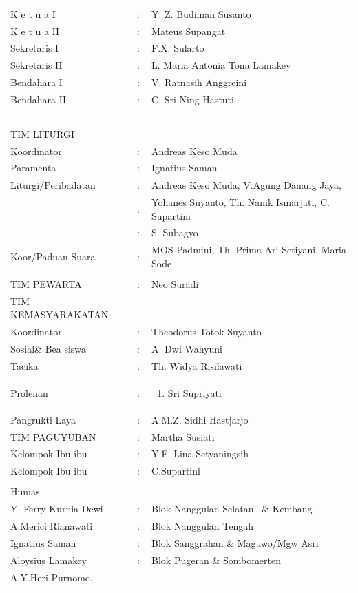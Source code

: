 \documentclass{article}
\begin{document}
\begin{flushleft}
\tablehead{}
\begin{supertabular}{m{4.1200004cm}m{0.15299998cm}m{8.621cm}}
K e t u a I &
\centering : &
Y. Z. Budiman Susanto\\
K e t u a II &
\centering : &
Mateus Supangat\\
Sekretaris I &
\centering : &
F.X. Sularto\\
Sekretaris II &
\centering : &
L. Maria Antonia Tona Lamakey\\
Bendahara I &
\centering : &
V. Ratnasih Anggreini\\
Bendahara II &
\centering : &
C. Sri Ning Hastuti\\
~ &
\centering ~ &
~\\
TIM LITURGI &
\centering ~ &
~\\
Koordinator &
\centering : &
Andreas Keso Muda\\
Paramenta  &
\centering : &
Ignatius Saman\\
Liturgi/Peribadatan &
\centering : &
Andreas Keso Muda, V.Agung Danang Jaya,\\
~ &
\centering : &
Yohanes Suyanto, Th. Nanik Ismarjati, C. Supartini\\
~ &
\centering : &
S. Subagyo\\
Koor/Paduan Suara &
\centering :   &
MOS Padmini, Th. Prima Ari Setiyani, Maria Sode\\
 &
 &
\\
TIM PEWARTA   &
\centering : &
Neo Suradi

\\
TIM KEMASYARAKATAN &
\centering ~ &
\\
Koordinator &
\centering : &
Theodorus Totok Suyanto\\
Sosial\& Bea siswa &
\centering : &
A. Dwi Wahyuni \\
Tacika &
\centering : &
Th. Widya Risilawati\\
Prolenan &
\centering : &
\begin{enumerate}
\item Sri Supriyati\end{enumerate}
\\
Pangrukti Laya &
\centering : &
A.M.Z. Sidhi Hastjarjo\\
TIM PAGUYUBAN &
\centering : &
Martha Susiati\\
Kelompok Ibu-ibu &
\centering : &
Y.F. Lina Setyaningsih\\
Kelompok Ibu-ibu &
\centering : &
C.Supartini\\
 &
 &
\\
Humas &
 &
\\
Y. Ferry Kurnia Dewi &
\centering : &
Blok Nanggulan Selatan ~\& Kembang\\
A.Merici Rianawati &
\centering : &
Blok Nanggulan Tengah\\
Ignatius Saman &
\centering : &
Blok Sanggrahan \& Maguwo/Mgw Asri\\
Aloysius Lamakey &
\centering : &
Blok Pugeran \& Sombomerten\\
A.Y.Heri Purnomo, 


\end{supertabular}
\end{flushleft}
\end{document}
